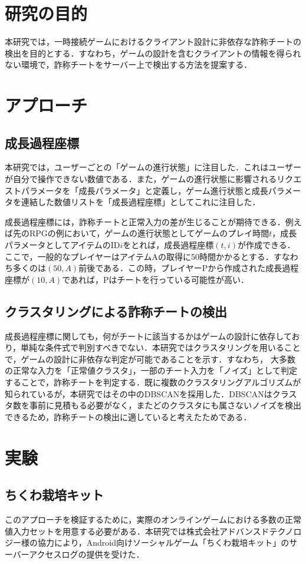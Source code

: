 \section{研究の目的}
本研究では，一時接続ゲームにおけるクライアント設計に非依存な詐称チートの検出を目的とする．すなわち，ゲームの設計を含むクライアントの情報を得られない環境で，詐称チートをサーバー上で検出する方法を提案する．

\section{アプローチ}
\subsection{成長過程座標}
本研究では，ユーザーごとの「ゲームの進行状態」に注目した．これはユーザーが自分で操作できない数値である．また，ゲームの進行状態に影響されるリクエストパラメータを「成長パラメータ」と定義し，ゲーム進行状態と成長パラメータを連結した数値リストを「成長過程座標」としてこれに注目した．

成長過程座標には，詐称チートと正常入力の差が生じることが期待できる．例えば先のRPGの例において，ゲームの進行状態としてゲームのプレイ時間$t$，成長パラメータとしてアイテムのID$i$をとれば，成長過程座標$(t, i)$が作成できる．ここで，一般的なプレイヤーはアイテムAの取得に50時間かかるとする．すなわち多くのは$(50, A)$前後である．この時，プレイヤーPから作成された成長過程座標が$(10, A)$であれば，Pはチートを行っている可能性が高い．

\subsection{クラスタリングによる詐称チートの検出}
成長過程座標に関しても，何がチートに該当するかはゲームの設計に依存しており，単純な条件式で判別すべきでない．本研究ではクラスタリングを用いることで，ゲームの設計に非依存な判定が可能であることを示す．すなわち，
大多数の正常な入力を「正常値クラスタ」，一部のチート入力を「ノイズ」として判定することで，詐称チートを判定する．既に複数のクラスタリングアルゴリズムが知られているが，本研究ではその中のDBSCANを採用した．DBSCANはクラスタ数を事前に見積もる必要がなく，またどのクラスタにも属さないノイズを検出できるため，詐称チートの検出に適していると考えたためである．

\section{実験}
\subsection{ちくわ栽培キット}
このアプローチを検証するために，実際のオンラインゲームにおける多数の正常値入力セットを用意する必要がある．本研究では株式会社アドバンスドテクノロジー様の協力により，Android向けソーシャルゲーム「ちくわ栽培キット」のサーバーアクセスログの提供を受けた．


